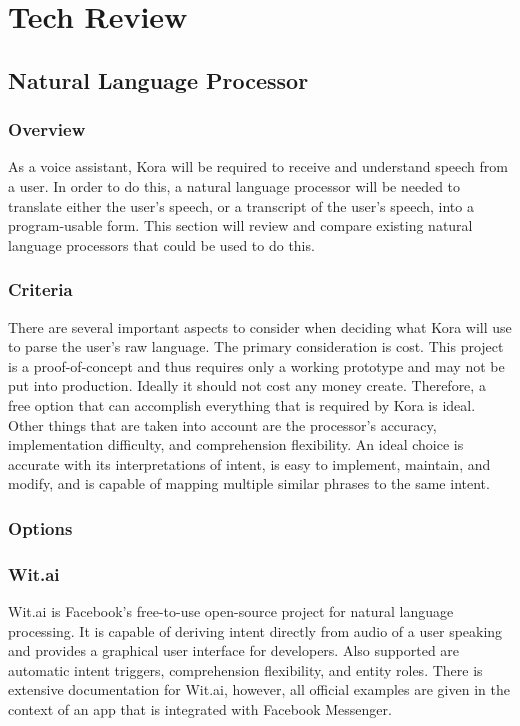 \documentclass[onecolumn, draftclsnofoot,10pt, compsoc]{IEEEtran}
\def \botname{Kora\xspace}
\begin{document}
\section{Tech Review}

	\subsection{Natural Language Processor}
	\subsubsection{Overview}
	As a voice assistant, \botname will be required to receive and understand speech from a user.
	In order to do this, a natural language processor will be needed to translate either the user's speech, or a transcript of the user's speech, into a program-usable form.
	This section will review and compare existing natural language processors that could be used to do this.

	\subsubsection{Criteria}
	There are several important aspects to consider when deciding what \botname will use to parse the user's raw language.
	The primary consideration is cost.
	This project is a proof-of-concept and thus requires only a working prototype and may not be put into production.
	Ideally it should not cost any money create.
	Therefore, a free option that can accomplish everything that is required by \botname is ideal.
	Other things that are taken into account are the processor's accuracy, implementation difficulty, and comprehension flexibility.
	An ideal choice is accurate with its interpretations of intent, is easy to implement, maintain, and modify, and is capable of mapping multiple similar phrases to the same intent.

	\subsubsection{Options}
	\subsubsection{Wit.ai}
	Wit.ai is Facebook's free-to-use open-source project for natural language processing\cite{WitFAQ}.
	It is capable of deriving intent directly from audio of a user speaking and provides a graphical user interface for developers.
	Also supported are automatic intent triggers, comprehension flexibility, and entity roles.
	There is extensive documentation for Wit.ai, however, all official examples are given in the context of an app that is integrated with Facebook Messenger\cite{NLPComparisons}.
\end{document}
